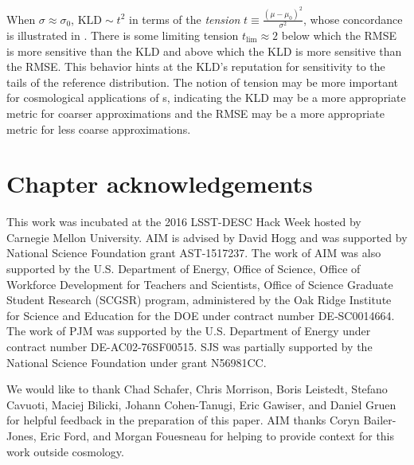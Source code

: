 When $\sigma\approx\sigma_{0}$, $\mathrm{KLD}\sim t^{2}$ in terms of the 
\textit{tension} $t\equiv\frac{(\mu-\mu_{0})^{2}}{\sigma^{2}}$, whose 
concordance is illustrated in .
There is some limiting tension $t_{\mathrm{lim}}\approx2$ below which the RMSE 
is more sensitive than the KLD and above which the KLD is more sensitive than 
the RMSE.
This behavior hints at the KLD's reputation for sensitivity to the tails of the 
reference distribution.
The notion of tension may be more important for cosmological applications of 
\pz s, indicating the KLD may be a more appropriate metric for coarser 
approximations and the RMSE may be a more appropriate metric for less coarse 
approximations.

\section*{Chapter acknowledgements}


This work was incubated at the 2016 LSST-DESC Hack Week hosted by Carnegie 
Mellon University.
AIM is advised by David Hogg and was supported by National Science Foundation 
grant AST-1517237.
The work of AIM was also supported by the U.S. Department of Energy, Office of 
Science, Office of Workforce Development for Teachers and Scientists, Office of 
Science Graduate Student Research (SCGSR) program, administered by the Oak 
Ridge Institute for Science and Education for the DOE under contract number 
DE‐SC0014664.
The work of PJM was supported by the U.S. Department of Energy under contract 
number DE-AC02-76SF00515.
SJS was partially supported by the National Science Foundation under grant 
N56981CC.

We would like to thank Chad Schafer, Chris Morrison, Boris Leistedt, Stefano 
Cavuoti, Maciej Bilicki, Johann Cohen-Tanugi, Eric Gawiser, and Daniel Gruen 
for helpful feedback in the preparation of this paper.
AIM thanks Coryn Bailer-Jones, Eric Ford, and Morgan Fouesneau for helping to 
provide context for this work outside cosmology.
